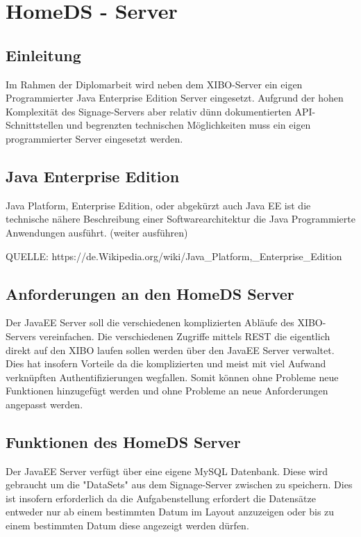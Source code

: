 \chapter{HomeDS - Server}
\section{Einleitung}\label{sec:einleitung}
Im Rahmen der Diplomarbeit wird neben dem XIBO-Server ein eigen Programmierter Java Enterprise Edition Server eingesetzt. Aufgrund der hohen Komplexität des Signage-Servers aber relativ dünn dokumentierten API-Schnittstellen und begrenzten technischen Möglichkeiten muss ein eigen programmierter Server eingesetzt werden. 
 
\section{Java Enterprise Edition}\label{sec:javaee}
Java Platform, Enterprise Edition, oder abgekürzt auch Java EE ist die technische nähere Beschreibung einer Softwarearchitektur die Java Programmierte Anwendungen ausführt.
(weiter ausführen)

QUELLE: https://de.Wikipedia.org/wiki/Java_Platform,_Enterprise_Edition
 
\section{Anforderungen an den HomeDS Server}\label{sec:homeds}
Der JavaEE Server soll die verschiedenen komplizierten Abläufe des XIBO-Servers vereinfachen. Die verschiedenen Zugriffe mittels REST die eigentlich direkt auf den XIBO laufen sollen werden über den JavaEE Server verwaltet. Dies hat insofern Vorteile da die komplizierten und meist mit viel Aufwand verknüpften Authentifizierungen wegfallen. Somit können ohne Probleme neue Funktionen hinzugefügt werden und ohne Probleme an neue Anforderungen angepasst werden.
 
\section{Funktionen des HomeDS Server}\label{sec:homedsfunction}
Der JavaEE Server verfügt über eine eigene MySQL Datenbank. Diese wird gebraucht um die "DataSets" aus dem Signage-Server zwischen zu speichern. Dies ist insofern erforderlich da die Aufgabenstellung erfordert die Datensätze entweder nur ab einem bestimmten Datum im Layout anzuzeigen oder bis zu einem bestimmten Datum diese angezeigt werden dürfen. 
 
